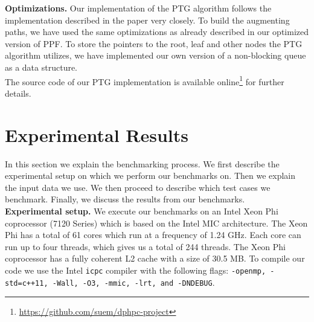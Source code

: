 \documentclass[letterpaper]{article}
\newcommand{\mypar}[1]{{\bf #1.}}
\begin{document}
\mypar{Optimizations}
Our implementation of the PTG algorithm follows the implementation described in the paper very closely. To build the augmenting paths, we have used the same optimizations as already described in our optimized version of PPF. To store the pointers to the root, leaf and other nodes the PTG algorithm utilizes, we have implemented our own version of a non-blocking queue as a data structure. \\
The source code of our PTG implementation is available online\footnote{\url{https://github.com/suem/dphpc-project}} for further details.


\section{Experimental Results}\label{sec:exp}

In this section we explain the benchmarking process. We first describe the experimental setup on which we perform our benchmarks on. Then we explain the input data we use. We then proceed to describe which test cases we benchmark. Finally, we discuss the results from our benchmarks.\\

\mypar{Experimental setup} 
We execute our benchmarks on an Intel Xeon Phi coprocessor (7120 Series) which is based on the Intel MIC architecture. The Xeon Phi has a total of 61 cores which run at a frequency of 1.24 GHz. Each core can run up to four threads, which gives us a total of 244 threads. The Xeon Phi coprocessor has a fully coherent L2 cache with a size of 30.5 MB. To compile our code we use the Intel \texttt{icpc} compiler with the following flags: \texttt{-openmp, -std=c++11, -Wall, -O3, -mmic, -lrt, and -DNDEBUG}.\\

\end{document}
